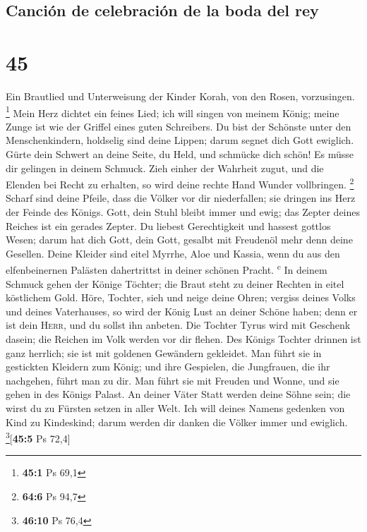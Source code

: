 \hypertarget{canciuxf3n-de-celebraciuxf3n-de-la-boda-del-rey}{%
\subsection{Canción de celebración de la boda del
rey}\label{canciuxf3n-de-celebraciuxf3n-de-la-boda-del-rey}}

\hypertarget{section-44}{%
\section{45}\label{section-44}}

 Ein Brautlied und Unterweisung der Kinder Korah, von den
Rosen, vorzusingen. \footnote{\textbf{45:1} Ps 69,1}  Mein
Herz dichtet ein feines Lied; ich will singen von meinem König; meine
Zunge ist wie der Griffel eines guten Schreibers.  Du bist
der Schönste unter den Menschenkindern, holdselig sind deine Lippen;
darum segnet dich Gott ewiglich.  Gürte dein Schwert an
deine Seite, du Held, und schmücke dich schön!  Es müsse
dir gelingen in deinem Schmuck. Zieh einher der Wahrheit zugut, und die
Elenden bei Recht zu erhalten, so wird deine rechte Hand Wunder
vollbringen. \footnote{\textbf{64:6} Ps 94,7}  Scharf sind
deine Pfeile, dass die Völker vor dir niederfallen; sie dringen ins Herz
der Feinde des Königs.  Gott, dein Stuhl bleibt immer und
ewig; das Zepter deines Reiches ist ein gerades Zepter. 
Du liebest Gerechtigkeit und hassest gottlos Wesen; darum hat dich Gott,
dein Gott, gesalbt mit Freudenöl mehr denn deine Gesellen.
 Deine Kleider sind eitel Myrrhe, Aloe und Kassia, wenn du
aus den elfenbeinernen Palästen dahertrittst in deiner schönen Pracht.
\textsuperscript{c}  In deinem Schmuck gehen der Könige
Töchter; die Braut steht zu deiner Rechten in eitel köstlichem Gold.
 Höre, Tochter, sieh und neige deine Ohren; vergiss
deines Volks und deines Vaterhauses,  so wird der König
Lust an deiner Schöne haben; denn er ist dein \textsc{Herr}, und du
sollst ihn anbeten.  Die Tochter Tyrus wird mit Geschenk
dasein; die Reichen im Volk werden vor dir flehen.  Des
Königs Tochter drinnen ist ganz herrlich; sie ist mit goldenen Gewändern
gekleidet.  Man führt sie in gestickten Kleidern zum
König; und ihre Gespielen, die Jungfrauen, die ihr nachgehen, führt man
zu dir.  Man führt sie mit Freuden und Wonne, und sie
gehen in des Königs Palast.  An deiner Väter Statt werden
deine Söhne sein; die wirst du zu Fürsten setzen in aller Welt.
 Ich will deines Namens gedenken von Kind zu Kindeskind;
darum werden dir danken die Völker immer und ewiglich.
\footnote{\textbf{46:10} Ps 76,4}{[}\textbf{45:5} Ps 72,4{]}

